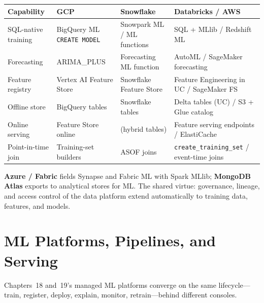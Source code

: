 \begin{center}
\footnotesize
\begin{tabular}{@{}p{2.8cm}p{3.0cm}p{3.0cm}p{3.4cm}@{}}
\toprule
\textbf{Capability} & \textbf{GCP} & \textbf{Snowflake} & \textbf{Databricks / AWS} \\
\midrule
SQL-native training & BigQuery ML \texttt{CREATE MODEL} & Snowpark ML / ML functions & SQL + MLlib / Redshift ML \\
Forecasting & ARIMA\_PLUS & Forecasting ML function & AutoML / SageMaker forecasting \\
Feature registry & Vertex AI Feature Store & Snowflake Feature Store & Feature Engineering in UC / SageMaker FS \\
Offline store & BigQuery tables & Snowflake tables & Delta tables (UC) / S3 + Glue catalog \\
Online serving & Feature Store online & (hybrid tables) & Feature serving endpoints / ElastiCache \\
Point-in-time join & Training-set builders & ASOF joins & \texttt{create\_training\_set} / event-time joins \\
\bottomrule
\end{tabular}
\end{center}

\noindent \textbf{Azure / Fabric} fields Synapse and Fabric ML with Spark MLlib; \textbf{MongoDB
Atlas} exports to analytical stores for ML. The shared virtue: governance, lineage, and access
control of the data platform extend automatically to training data, features, and models.

\section{ML Platforms, Pipelines, and Serving}
%
Chapters~18 and~19's managed ML platforms converge on the same lifecycle---train, register,
deploy, explain, monitor, retrain---behind different consoles.

